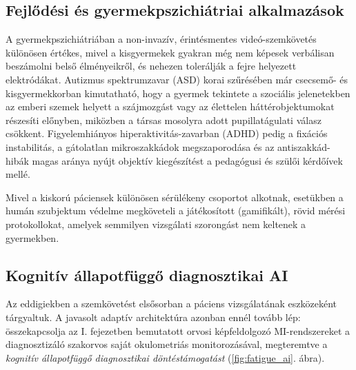 \documentclass[12pt,a4paper,oneside]{book}
\begin{document}
\subsection{Fejlődési és gyermekpszichiátriai alkalmazások}

A gyermekpszichiátriában a non-invazív, érintésmentes videó-szemkövetés különösen értékes, mivel a kisgyermekek gyakran még nem képesek verbálisan beszámolni belső élményeikről, és nehezen tolerálják a fejre helyezett elektródákat. Autizmus spektrumzavar (ASD) korai szűrésében már csecsemő- és kisgyermekkorban kimutatható, hogy a gyermek tekintete a szociális jelenetekben az emberi szemek helyett a szájmozgást vagy az élettelen háttérobjektumokat részesíti előnyben, miközben a társas mosolyra adott pupillatágulati válasz csökkent. Figyelemhiányos hiperaktivitás-zavarban (ADHD) pedig a fixációs instabilitás, a gátolatlan mikroszakkádok megszaporodása és az antiszakkád-hibák magas aránya nyújt objektív kiegészítést a pedagógusi és szülői kérdőívek mellé.

Mivel a kiskorú páciensek különösen sérülékeny csoportot alkotnak, esetükben a humán szubjektum védelme megköveteli a játékosított (gamifikált), rövid mérési protokollokat, amelyek semmilyen vizsgálati szorongást nem keltenek a gyermekben.

\subsection{Kognitív állapotfüggő diagnosztikai AI}

Az eddigiekben a szemkövetést elsősorban a páciens vizsgálatának eszközeként tárgyaltuk. A javasolt adaptív architektúra azonban ennél tovább lép: összekapcsolja az I. fejezetben bemutatott orvosi képfeldolgozó MI-rendszereket a diagnosztizáló szakorvos saját okulometriás monitorozásával, megteremtve a \emph{kognitív állapotfüggő diagnosztikai döntéstámogatást} (\ref{fig:fatigue_ai}. ábra).
\end{document}
